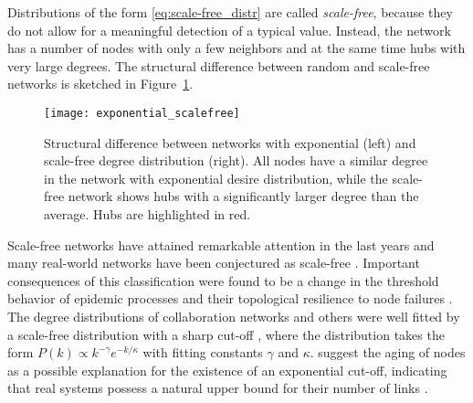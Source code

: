 Distributions of the form \eqref{eq:scale-free_distr} are called \emph{scale-free}, because they do not allow for a meaningful detection of a typical value.
Instead, the network has a number of nodes with only a few neighbors and at the same time hubs with very large degrees.
The structural difference between random and scale-free networks is sketched in Figure~\ref{fig:random_scalefree}.
%
\begin{figure}[htbp]
\begin{center}
\texttt{[image: exponential\_scalefree]}
\caption{Structural difference between networks with exponential (left) and scale-free degree distribution (right).
All nodes have a similar degree in the network with exponential desire distribution, while the scale-free network shows hubs with a significantly larger degree than the average.
Hubs are highlighted in red.}
\label{fig:random_scalefree}
\end{center}
\end{figure}

Scale-free networks have attained remarkable attention in the last years and many real-world networks have been conjectured as scale-free \citep{Barabasi99,Newman2003}.
Important consequences of this classification were found to be a change in the threshold behavior of epidemic processes \citep{Pastor-Satorras_vespi:2001} and their topological resilience to node failures \citep{Albert:2000}.
The degree distributions of collaboration networks and others were well fitted by a scale-free distribution with a sharp cut-off \citep{Newman:2001p,RevModPhys.74}, where the distribution takes the form $P(k)\propto k^{-\gamma }e^{-k/\kappa }$ with fitting constants $\gamma $ and $\kappa $.
\citeauthor{Amaral:2000} suggest the aging of nodes as a possible explanation for the existence of an exponential cut-off, indicating that real systems possess a natural upper bound for their number of links \citep{Amaral:2000}.

